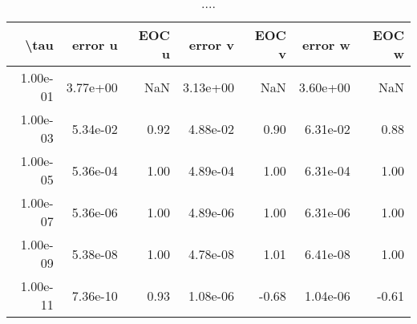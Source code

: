 \begin{table}[ht]
\centering
\begin{tabular}{rrrrrrr}
  \hline
  \textbf{\textbackslash{}tau} & \textbf{error u} & \textbf{EOC u} & \textbf{error v} & \textbf{EOC v} & \textbf{error w} & \textbf{EOC w} \\\hline
  1.00e-01 & 3.77e+00 & NaN & 3.13e+00 & NaN & 3.60e+00 & NaN \\
  1.00e-03 & 5.34e-02 & 0.92 & 4.88e-02 & 0.90 & 6.31e-02 & 0.88 \\
  1.00e-05 & 5.36e-04 & 1.00 & 4.89e-04 & 1.00 & 6.31e-04 & 1.00 \\
  1.00e-07 & 5.36e-06 & 1.00 & 4.89e-06 & 1.00 & 6.31e-06 & 1.00 \\
  1.00e-09 & 5.38e-08 & 1.00 & 4.78e-08 & 1.01 & 6.41e-08 & 1.00 \\
  1.00e-11 & 7.36e-10 & 0.93 & 1.08e-06 & -0.68 & 1.04e-06 & -0.61 \\\hline
\end{tabular}
\caption{....}
\end{table}
